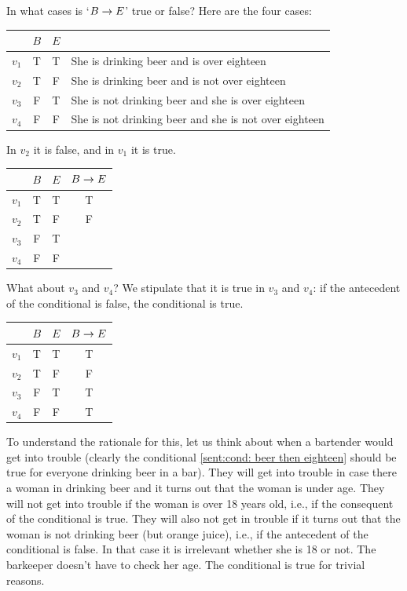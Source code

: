 In what cases is `$B\rightarrow E$' true or false? Here are the four cases:
\begin{center}
	\begin{tabular}{rccl}
		&$B$&$E$\\\hline
		$v_1$&T&T&She is drinking beer and is over eighteen\\
		$v_2$&T&F&She is drinking beer and is not over eighteen\\
		$v_3$&F&T&She is not drinking beer and she is over eighteen\\
		$v_4$&F&F&She is not drinking beer and she is not over eighteen\\
	\end{tabular}
\end{center}
In $v_2$ it is false, and in $v_1$ it is true. 
\begin{center}
	\begin{tabular}{rcc|c}
		&$B$&$E$&$B\rightarrow E$\\\hline
		$v_1$&T&T&T\\
		$v_2$&T&F&F\\
		$v_3$&F&T&\\
		$v_4$&F&F&
	\end{tabular}
\end{center}
What about $v_3$ and $v_4$? 
We stipulate that it is true in $v_3$ and $v_4$: if the antecedent of the conditional is false, the conditional is true.
\begin{center}
	\begin{tabular}{rcc|c}
		&$B$&$E$&$B\rightarrow E$\\\hline
		$v_1$&T&T&T\\
		$v_2$&T&F&F\\
		$v_3$&F&T&T\\
		$v_4$&F&F&T
	\end{tabular}
\end{center}

To understand the rationale for this, let us think about when a bartender would get into trouble (clearly the conditional \ref{sent:cond: beer then eighteen} should be true for everyone drinking beer in a bar). They will get into trouble in case there a woman in drinking beer and it turns out that the woman is under age. They will not get into trouble if the woman is over 18 years old, i.e., if the consequent of the conditional is true. They will also not get in trouble if it turns out that the woman is not drinking beer (but orange juice), i.e., if the antecedent of the conditional is false.  In that case it is irrelevant whether she is 18 or not. The barkeeper doesn't have to check her age. The conditional is true for trivial reasons.







